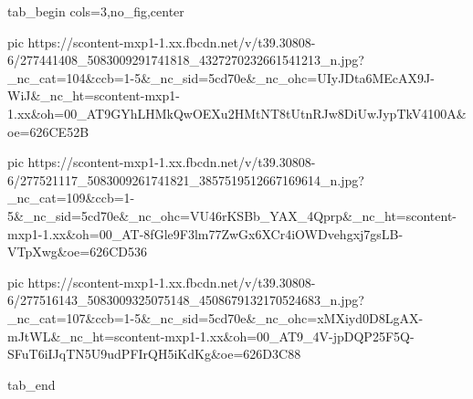  
 
 
 
 

\ifcmt
  tab_begin cols=3,no_fig,center

     pic https://scontent-mxp1-1.xx.fbcdn.net/v/t39.30808-6/277441408_5083009291741818_4327270232661541213_n.jpg?_nc_cat=104&ccb=1-5&_nc_sid=5cd70e&_nc_ohc=UIyJDta6MEcAX9J-WiJ&_nc_ht=scontent-mxp1-1.xx&oh=00_AT9GYhLHMkQwOEXu2HMtNT8tUtnRJw8DiUwJypTkV4100A&oe=626CE52B

     pic https://scontent-mxp1-1.xx.fbcdn.net/v/t39.30808-6/277521117_5083009261741821_3857519512667169614_n.jpg?_nc_cat=109&ccb=1-5&_nc_sid=5cd70e&_nc_ohc=VU46rKSBb_YAX_4Qprp&_nc_ht=scontent-mxp1-1.xx&oh=00_AT-8fGle9F3lm77ZwGx6XCr4iOWDvehgxj7gsLB-VTpXwg&oe=626CD536

     pic https://scontent-mxp1-1.xx.fbcdn.net/v/t39.30808-6/277516143_5083009325075148_4508679132170524683_n.jpg?_nc_cat=107&ccb=1-5&_nc_sid=5cd70e&_nc_ohc=xMXiyd0D8LgAX-mJtWL&_nc_ht=scontent-mxp1-1.xx&oh=00_AT9_4V-jpDQP25F5Q-SFuT6iIJqTN5U9udPFIrQH5iKdKg&oe=626D3C88

  tab_end
\fi
